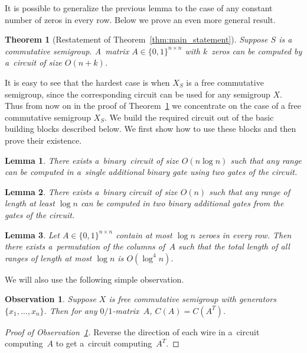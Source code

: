 \documentclass[11pt,letterpaper]{article}
\newtheorem{lemma}{Lemma}
\newtheorem{observation}{Observation}
\newtheorem{theorem}{Theorem}
\begin{document}
It is possible to generalize the previous lemma to the case of
any constant number of zeros in every row. Below we prove
an even more general result.


\begin{theorem}[Restatement of Theorem~\ref{thm:main_statement}]\label{thm:main}
Suppose $S$ is a commutative semigroup. A~matrix $A \in \{0,1\}^{n \times n}$
with $k$~zeros can be computed by a~circuit of size $O(n+k)$.
\end{theorem}

It is easy to see that the hardest case is when $X_S$ is a free commutative
semigroup, since the corresponding circuit can be used for any semigroup $X$.
Thus from now on in the proof of Theorem~\ref{thm:main} we concentrate on the
case of a free commutative semigroup $X_S$. We build the required circuit out
of the basic building blocks described below. We first show how to use these
blocks and then prove their existence.

\begin{lemma}\label{lemma:decompose}
There exists a~binary~circuit of size $O(n\log n)$ such that
any range can be computed in a~single additional binary gate
using two gates of the circuit.
\end{lemma}

\begin{lemma}\label{lemma:blocks}
There exists a~binary circuit of size $O(n)$ such that any range
of length at least $\log n$ can be computed in two binary
additional gates from the gates of the circuit.
\end{lemma}

\begin{lemma}\label{lemma:permute}
Let $A \in \{0,1\}^{n \times n}$ contain at most $\log n$ zeroes in
every row. Then there exists a~permutation of the columns of~$A$
such that the total length of all ranges of length
at most $\log n$ is $O(\log^4 n)$.
\end{lemma}

We will also use the following simple observation.

\begin{observation}\label{obs:transpose}
Suppose $X$ is free commutative semigroup with generators $\{x_1,\ldots, x_n\}$.
Then for any $0/1$-matrix~$A$, $C(A)=C(A^T)$.
\end{observation}
\begin{proof}[Proof of Observation~\ref{obs:transpose}]
Reverse the direction of each wire in a~circuit computing~$A$ to get a~circuit
computing~$A^T$.
\end{proof}
\end{document}
